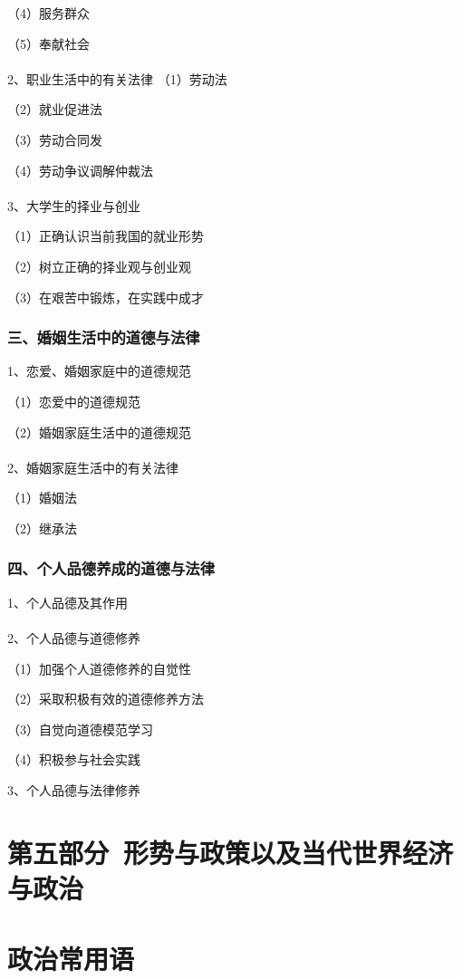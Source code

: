 \documentclass{ctexart}
\begin{document}
（4）服务群众

（5）奉献社会
\\\\

2、职业生活中的有关法律
（1）劳动法

（2）就业促进法

（3）劳动合同发

（4）劳动争议调解仲裁法
\\\\

3、大学生的择业与创业

（1）正确认识当前我国的就业形势

（2）树立正确的择业观与创业观

（3）在艰苦中锻炼，在实践中成才

\subsubsection{三、婚姻生活中的道德与法律}

1、恋爱、婚姻家庭中的道德规范

（1）恋爱中的道德规范

（2）婚姻家庭生活中的道德规范
\\\\

2、婚姻家庭生活中的有关法律

（1）婚姻法

（2）继承法


\subsubsection{四、个人品德养成的道德与法律}
1、个人品德及其作用
\\\\

2、个人品德与道德修养

（1）加强个人道德修养的自觉性

（2）采取积极有效的道德修养方法

（3）自觉向道德模范学习

（4）积极参与社会实践

3、个人品德与法律修养
\section{第五部分\ 形势与政策以及当代世界经济与政治}

\section{政治常用语}
\end{document}
